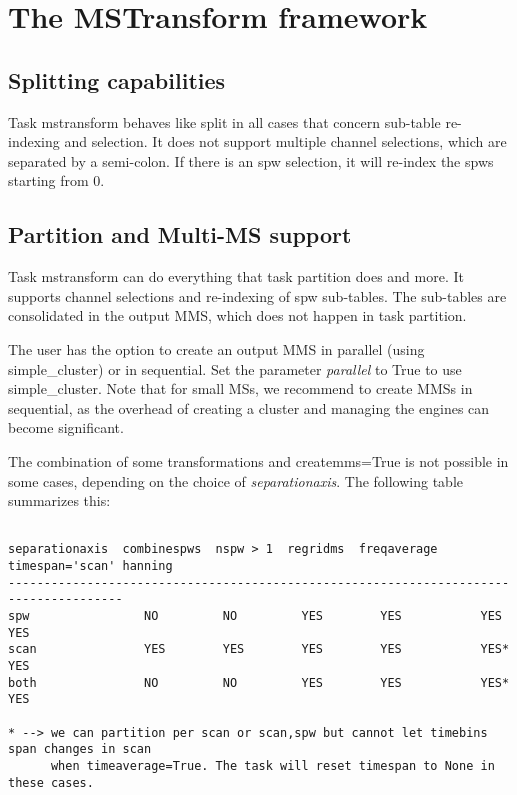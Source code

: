

\section{The MSTransform framework}\label{Sec:Running}

\subsection{Splitting capabilities}
Task mstransform behaves like split in all cases that concern sub-table re-indexing
and selection. It does not support multiple channel selections, which are separated by
a semi-colon. If there is an spw selection, it will re-index the spws starting from 0.

\subsection{Partition and Multi-MS support}
Task mstransform can do everything that task partition does and more. It supports
channel selections and re-indexing of spw sub-tables. The sub-tables are consolidated
in the output MMS, which does not happen in task partition. %

The user has the option to create an output MMS in parallel (using simple_cluster) or
in sequential. Set the parameter {\it parallel} to True to use simple_cluster. Note that
for small MSs, we recommend to create MMSs in sequential, as the overhead of creating
a cluster and managing the engines can become significant.

The combination of some transformations and createmms=True is not possible in
some cases, depending on the choice of {\it separationaxis}. The following table summarizes this:

\begin{verbatim}

separationaxis  combinespws  nspw > 1  regridms  freqaverage  timespan='scan' hanning
--------------------------------------------------------------------------------------
spw                NO         NO         YES        YES           YES           YES
scan               YES        YES        YES        YES           YES*          YES
both               NO         NO         YES        YES           YES*          YES

* --> we can partition per scan or scan,spw but cannot let timebins span changes in scan
      when timeaverage=True. The task will reset timespan to None in these cases.

\end{verbatim}

